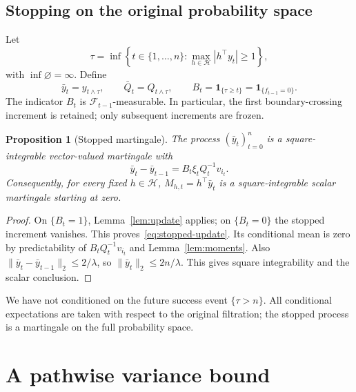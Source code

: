 \documentclass[11pt,a4paper]{article}
\numberwithin{equation}{section}
\newtheorem{proposition}[theorem]{Proposition}
\theoremstyle{remark}
\newcommand{\F}{\mathcal F}
\newcommand{\HH}{\mathcal H}
\newcommand{\ind}{\mathbf 1}
\begin{document}
\subsection{Stopping on the original probability space}

Let
\begin{equation}\label{eq:stopping}
 \tau=\inf\!\left\{t\in\{1,\ldots,n\}:
       \max_{h\in\HH}|h^\top y_t|\ge1\right\},
\end{equation}
with $\inf\varnothing=\infty$. Define
\begin{equation}\label{eq:stopped-states}
 \bar y_t=y_{t\wedge\tau},\qquad
 \bar Q_t=Q_{t\wedge\tau},\qquad
 B_t=\ind_{\{\tau\ge t\}}=\ind_{\{f_{t-1}=0\}}.
\end{equation}
The indicator $B_t$ is $\F_{t-1}$-measurable. In particular, the first
boundary-crossing increment is retained; only subsequent increments
are frozen.

\begin{proposition}[Stopped martingale]
\label{prop:martingale}
The process $(\bar y_t)_{t=0}^n$ is a square-integrable vector-valued
martingale with
\begin{equation}\label{eq:stopped-update}
 \bar y_t-\bar y_{t-1}=B_t\xi_tQ_t^{-1}v_{i_t}.
\end{equation}
Consequently, for every fixed $h\in\HH$,
$M_{h,t}=h^\top\bar y_t$ is a square-integrable scalar martingale
starting at zero.
\end{proposition}
\begin{proof}
On $\{B_t=1\}$, Lemma~\ref{lem:update} applies; on $\{B_t=0\}$ the
stopped increment vanishes. This proves~\eqref{eq:stopped-update}.
Its conditional mean is zero by predictability of $B_tQ_t^{-1}v_{i_t}$
and Lemma~\ref{lem:moments}. Also
$\|\bar y_t-\bar y_{t-1}\|_2\le2/\lambda$, so
$\|\bar y_t\|_2\le2n/\lambda$. This gives square integrability and
the scalar conclusion.
\end{proof}

We have not conditioned on the future success event $\{\tau>n\}$.
All conditional expectations are taken with respect to the original
filtration; the stopped process is a martingale on the full probability
space.

\section{A pathwise variance bound}
\end{document}
